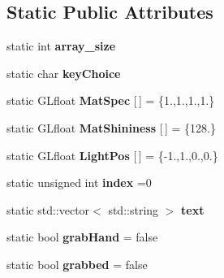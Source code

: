 \subsection*{Static Public Attributes}
\begin{DoxyCompactItemize}
\item 
static int {\bfseries array\+\_\+size}\hypertarget{classglDisplay_a3654d7c4284e03ae73cb8b9fe992e474}{}\label{classglDisplay_a3654d7c4284e03ae73cb8b9fe992e474}

\item 
static char {\bfseries key\+Choice}\hypertarget{classglDisplay_a9ad64fa821db85c37dc6372ff1523d61}{}\label{classglDisplay_a9ad64fa821db85c37dc6372ff1523d61}

\item 
static G\+Lfloat {\bfseries Mat\+Spec} \mbox{[}$\,$\mbox{]} = \{1.,1.,1.,1.\}\hypertarget{classglDisplay_aa6163983ece89a7951835565746d9cc7}{}\label{classglDisplay_aa6163983ece89a7951835565746d9cc7}

\item 
static G\+Lfloat {\bfseries Mat\+Shininess} \mbox{[}$\,$\mbox{]} = \{128.\}\hypertarget{classglDisplay_ae6fdd98e5b894faa03c38a561497ca3f}{}\label{classglDisplay_ae6fdd98e5b894faa03c38a561497ca3f}

\item 
static G\+Lfloat {\bfseries Light\+Pos} \mbox{[}$\,$\mbox{]} = \{-\/1.,1.,0.,0.\}\hypertarget{classglDisplay_afcfb2e2fb2c97519e490c202d3e3f7c5}{}\label{classglDisplay_afcfb2e2fb2c97519e490c202d3e3f7c5}

\item 
static unsigned int {\bfseries index} =0\hypertarget{classglDisplay_a71ccb281535efeea8ff29fc508f499f6}{}\label{classglDisplay_a71ccb281535efeea8ff29fc508f499f6}

\item 
static std\+::vector$<$ std\+::string $>$ {\bfseries text}\hypertarget{classglDisplay_ab7d941a21d86cd5726f8c34ffca762f1}{}\label{classglDisplay_ab7d941a21d86cd5726f8c34ffca762f1}

\item 
static bool {\bfseries grab\+Hand} = false\hypertarget{classglDisplay_ac8c8f7619b6e776b75b02be2f3203e19}{}\label{classglDisplay_ac8c8f7619b6e776b75b02be2f3203e19}

\item 
static bool {\bfseries grabbed} = false\hypertarget{classglDisplay_ae7724c41f1cf5c3d3cc0c852702b4c8a}{}\label{classglDisplay_ae7724c41f1cf5c3d3cc0c852702b4c8a}


\end{DoxyCompactItemize}
